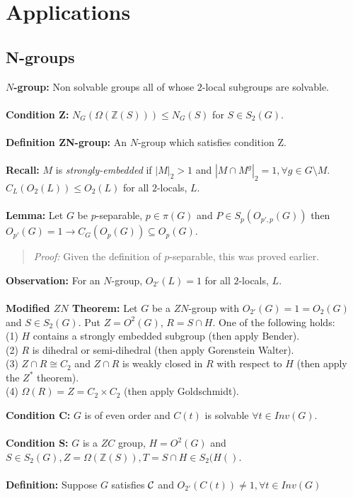 \chapter{Applications}
\section {N-groups}
{\bf $N$-group:}  Non solvable groups all of whose $2$-local subgroups are solvable.
\\
\\
{\bf Condition Z:}  $N_G(\Omega({\mathbb Z}(S))) \le N_G(S)$ for $S \in S_2(G)$.
\\
\\
{\bf Definition ZN-group:} An $N$-group which satisfies condition Z.
\\
\\
{\bf Recall:}  $M$ is \emph{strongly-embedded} if
$|M|_2 > 1$ and $|M \cap M^g|_2=1, \forall g \in G \setminus M$.  $C_L(O_2(L)) \le O_2(L)$ for all
$2$-locals, $L$.
\\
\\
{\bf Lemma:} Let $G$ be $p$-separable, $p \in \pi(G)$ and $P \in S_p(O_{p', p}(G))$ then
$O_{p'}(G)=1 \rightarrow C_G(O_p(G)) \subseteq O_p(G)$.
\begin{quote}
\emph{Proof:}
Given the definition of $p$-separable, this was proved earlier.
\end{quote}
{\bf Observation:} For an $N$-group, $O_{2'}(L)=1$ for all $2$-locals, $L$.
\\
\\
{\bf Modified $ZN$ Theorem:}  Let $G$ be a $ZN$-group with $O_{2'}(G)=1=O_2(G)$ and $S \in S_2(G)$.
Put
$Z= O^2(G)$, $R= S \cap H$.  One of the following holds:\\
(1) $H$ contains a strongly embedded subgroup (then apply Bender).\\
(2) $R$ is dihedral or semi-dihedral (then apply Gorenstein Walter).\\
(3) $Z \cap R \cong C_2$ and $Z \cap R$ is weakly closed in $R$ with respect to 
$H$ (then apply the $Z^*$ theorem).\\
(4) $\Omega(R)=Z= C_2 \times C_2$ (then apply Goldschmidt).
\begin{quote}
\end{quote}
{\bf Condition {\cal C}:}  $G$ is of even order and $C(t)$ is solvable $\forall t \in Inv(G)$.
\\
\\
{\bf Condition {\cal S}:}  $G$ is a $ZC$ group, $H=O^2(G)$ and
$S \in S_2(G), Z= \Omega({\mathbb Z}(S)), T= S \cap H \in S_2(H()$.
\\
\\
{\bf Definition:}  Suppose $G$ satisfies ${\cal C}$ and $O_{2'}(C(t)) \ne 1, \forall t \in Inv(G)$
\\
\\
